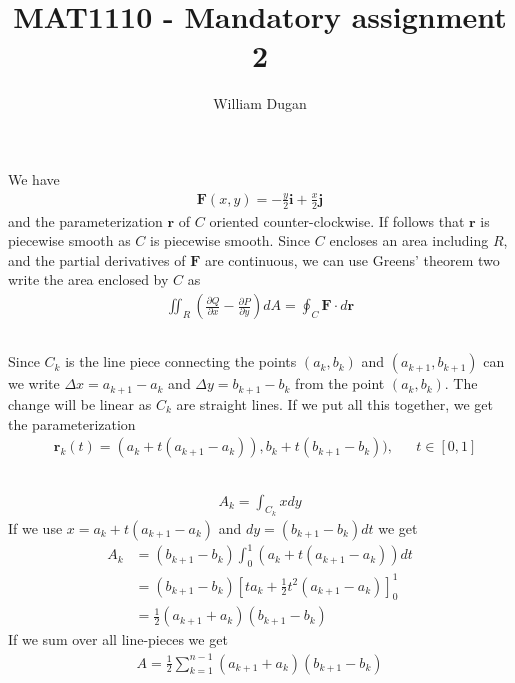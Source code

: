\documentclass[a4paper,10pt,english]{article}
\title{MAT1110 - Mandatory assignment 2}
\author{William Dugan}
\begin{document}
\maketitle

\section{} \label{1}

\subsection{} \label{1a}

We have
\begin{align}
    \bm{F} (x, y) = - \frac{y}{2} \bm{i} + \frac{x}{2} \bm{j}
\end{align}
and the parameterization $\bm{r}$ of $C$ oriented counter-clockwise. If follows that $\bm{r}$ is piecewise smooth as $C$ is piecewise smooth. Since $C$ encloses an area including $R$, and the partial derivatives of $\bm{F}$ are continuous, we can use Greens' theorem two write the area enclosed by $C$ as
\begin{align*}
    \iint_R \left( \frac{\partial Q}{\partial x} - \frac{\partial P}{\partial y} \right) dA 
    = \oint_C \bm{F} \cdot d\bm{r}
\end{align*}

\subsection{} \label{1b}
Since $C_k$ is the line piece connecting the points $(a_k, b_k)$ and $(a_{k+1}, b_{k+1})$ can we write \newline $\Delta x = a_{k+1} - a_k$ and $\Delta y = b_{k+1} - b_k$ from the point $(a_k, b_k)$. The change will be linear as $C_k$ are straight lines. If we put all this together, we get the parameterization
\begin{align}
    &\bm{r}_k (t) = 
    (a_k + t (a_{k+1} - a_k)), b_k + t (b_{k+1} - b_k)), 
    & &t \in [0, 1]
\end{align}

\subsection{} \label{1c}
\begin{align}
    A_k = \int_{C_k} x dy
\end{align}
If we use $x = a_k + t (a_{k+1} - a_k)$ and $dy = ( b_{k+1} - b_k) dt$ we get
\begin{align*}
    A_k &= (b_{k+1} - b_k) \int_0^1 (a_k + t (a_{k+1} - a_k)) dt \\
    &= (b_{k+1} - b_k) \left[ ta_k + \frac{1}{2} t^2 (a_{k+1} - a_k) \right]_0^1 \\
    &= \frac{1}{2} (a_{k+1} + a_k)(b_{k+1} - b_k)
\end{align*}
If we sum over all line-pieces we get
\begin{align} \label{eq:sum}
    A = \frac{1}{2} \sum_{k=1}^{n-1} (a_{k+1} + a_k)(b_{k+1} - b_k) 
\end{align}
\end{document}
